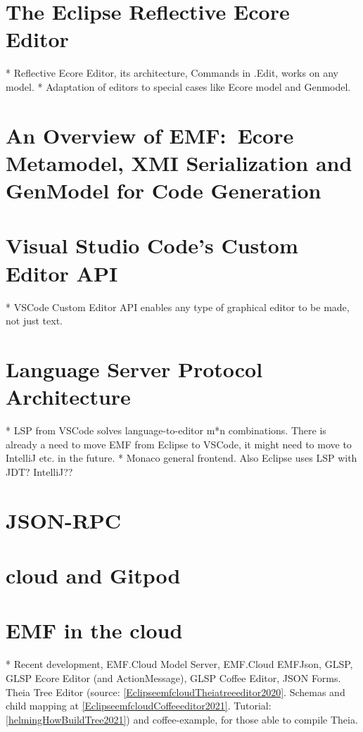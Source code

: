 \section{The Eclipse Reflective Ecore Editor}

* Reflective Ecore Editor, its architecture, Commands in .Edit, works on any model.
* Adaptation of editors to special cases like Ecore model and Genmodel.

\section{An Overview of EMF:\ Ecore Metamodel, XMI Serialization and GenModel for Code Generation}\label{sec:emf-metamodel}




\section{Visual Studio Code's Custom Editor API}\label{sec:vscode-custom-editor}
* VSCode Custom Editor API enables any type of graphical editor to be made, not just text.


\section{Language Server Protocol Architecture}\label{sec:lsp}
* LSP from VSCode solves language-to-editor m*n combinations. There is already a need to move EMF from Eclipse to VSCode, it might need to move to IntelliJ etc. in the future.
* Monaco general frontend. Also Eclipse uses LSP with JDT? IntelliJ??

\section{JSON-RPC}

\section{\Gls{cloud} and \gls{Gitpod}}




\section{\acrlong{EMF} in the \Gls{cloud}}\label{sec:emf-in-cloud}
* Recent development, EMF.Cloud Model Server, EMF.Cloud EMFJson, GLSP, GLSP Ecore Editor (and ActionMessage\label{par:glsp-actionmessage}), GLSP Coffee Editor, JSON Forms.
Theia Tree Editor\label{par:theia-tree-editor} (source: \cref{EclipseemfcloudTheiatreeeditor2020}. Schemas and child mapping at \cref{EclipseemfcloudCoffeeeditor2021}. Tutorial: \cref{helmingHowBuildTree2021}) and coffee-example, for those able to compile Theia.

